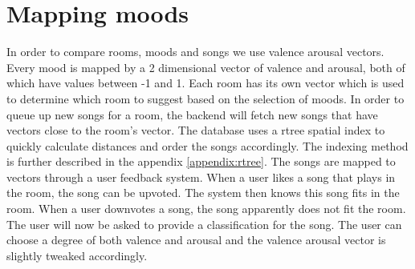 \section{Mapping moods}
\label{mapping-moods}
In order to compare rooms, moods and songs we use valence arousal vectors.
Every mood is mapped by a 2 dimensional vector of valence and arousal, both of which have values between -1 and 1.
Each room has its own vector which is used to determine which room to suggest based on the selection of moods.
In order to queue up new songs for a room, the backend will fetch new songs that have vectors close to the room's vector.
The database uses a \gls{rtree} spatial index to quickly calculate distances and order the songs accordingly.
The indexing method is further described in the appendix \ref{appendix:rtree}.
The songs are mapped to vectors through a user feedback system.
When a user likes a song that plays in the room, the song can be upvoted.
The system then knows this song fits in the room.
When a user downvotes a song, the song apparently does not fit the room.
The user will now be asked to provide a classification for the song.
The user can choose a degree of both valence and arousal and the valence arousal vector is slightly tweaked accordingly.
